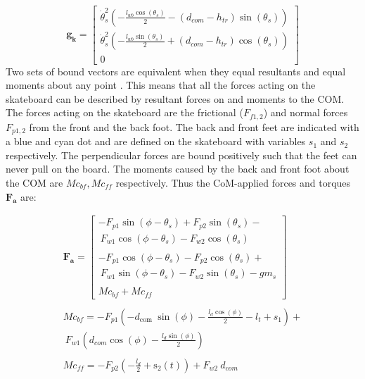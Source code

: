 \documentclass[default,iicol]{sn-jnl}
\begin{document}
\begin{equation}
\mathbf{g_k} = 
\left[\begin{array}{c}
\dot \theta_s^2\left(-\frac{l_{w b} \cos \left(\theta_s\right)}{2}-\left(d_{c o m}-h_{t r}\right) \sin \left(\theta_s\right)\right) \\
\dot \theta_s^2\left(-\frac{l_{w b} \sin \left(\theta_s\right)}{2}+\left(d_{c o m}-h_{t r}\right) \cos \left(\theta_s\right)\right) \\
0
\end{array}\right]
\end{equation}
Two sets of bound vectors are equivalent when they equal resultants and equal moments about any point \cite{moore_force_2022}. This means that all the forces acting on the skateboard can be described by resultant forces on and moments to the COM. The forces acting on the skateboard are the frictional ($F_{f1,2}$) and normal forces $F_{p1,2}$ from the front and the back foot. The back and front feet are indicated with a blue and cyan dot and are defined on the skateboard with variables $s_1$ and $s_2$ respectively. The perpendicular forces are bound positively such that the feet can never pull on the board. The moments caused by the back and front foot about the COM are $Mc_{bf}, Mc_{ff}$ respectively. Thus the CoM-applied forces and torques $\mathbf{F_{a}}$ are:
 
\begin{equation}\label{e_Fi}
\begin{array}{c}
    \mathbf{F_{a}}= \left[\begin{array}{l}
-F_{p 1} \sin \left(\phi-\theta_s\right)+F_{p 2} \sin \left(\theta_s\right)- \\ \ F_{w 1} \cos \left(\phi-\theta_s\right)-F_{w 2} \cos \left(\theta_s\right) \\ \\
-F_{p 1} \cos \left(\phi-\theta_s\right)-F_{p 2} \cos \left(\theta_s\right)+ \\ \ F_{w 1} \sin \left(\phi-\theta_s\right)-F_{w 2} \sin \left(\theta_s\right)-g m_s \\ \\
Mc_{bf} + Mc_{ff}
\end{array}\right] 
\\ \\
Mc_{bf} = -F_{p 1} (-d_{\text {com }} \sin (\phi)-\frac{l_d \cos (\phi)}{2}-l_t+s_1)+ \\ \ F_{w 1}(d_{c o m} \cos (\phi)-\frac{l_d \sin (\phi)}{2})
\\ \\
Mc_{ff} = -F_{p 2}\left(-\frac{l_d}{2}+\mathrm{s}_2(t)\right)+F_{w 2} \ d_{c o m}
\end{array}
\end{equation}  
\end{document}
